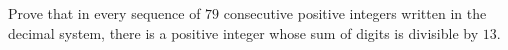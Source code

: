 Prove that in every sequence of $79$ consecutive positive integers written in the decimal system, there is a positive integer whose sum of digits is divisible by $13$.